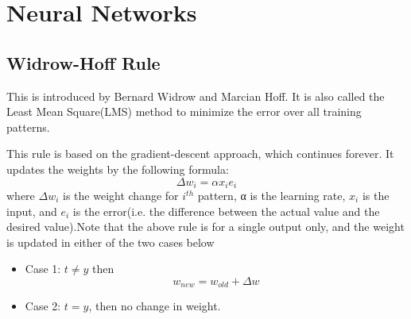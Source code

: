 
\chapter{Neural Networks} %

\label{AppendixA} %

\section{Widrow-Hoff Rule}
This is introduced by Bernard Widrow and Marcian Hoff. It is also called the Least Mean Square(LMS) method to minimize the error over all training patterns.

This rule is based on the gradient-descent approach, which continues forever. It updates the weights by the following formula:
$$\Delta w_{i} = \alpha x_{i}e_{i}$$
where $\Delta w_{i}$ is the weight change for $i^{th}$ pattern, α is the learning rate, $x_{i}$ is the input, and $e_{i}$ is the error(i.e. the difference between the actual value and the desired value).Note that the above rule is for a single output only, and the weight is updated in either of the two cases below
\begin{itemize}
    \item Case 1: $t\neq y$ then $$w_{new} = w_{old}+ \Delta w$$
    \item Case 2: $t =y$, then no change in weight.
\end{itemize}